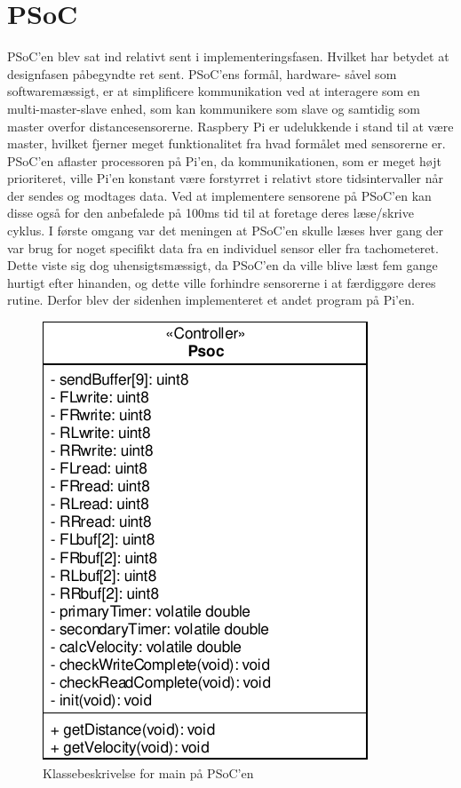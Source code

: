 \section{PSoC} \label{sec:sw_design_psoc_psoc}

PSoC'en blev sat ind relativt sent i implementeringsfasen. Hvilket har betydet at designfasen påbegyndte ret sent.
PSoC'ens formål, hardware- såvel som softwaremæssigt, er at simplificere \IIC kommunikation ved at interagere som en multi-master-slave enhed, som kan kommunikere som \IIC slave og samtidig som \IIC master overfor distancesensorerne. 
Raspbery Pi er udelukkende i stand til at være master, hvilket fjerner meget funktionalitet fra hvad formålet med sensorerne er. 
PSoC'en aflaster processoren på Pi'en, da \IIC kommunikationen, som er meget højt prioriteret, ville Pi'en konstant være forstyrret i relativt store tidsintervaller når der sendes og modtages data. 
Ved at implementere sensorene på PSoC'en kan disse også for den anbefalede på 100ms tid til at foretage deres læse/skrive cyklus. 
I første omgang var det meningen at PSoC'en skulle læses hver gang der var brug for noget specifikt data fra en individuel sensor eller fra tachometeret. 
Dette viste sig dog uhensigtsmæssigt, da PSoC'en da ville blive læst fem gange hurtigt efter hinanden, og dette ville forhindre sensorerne i at færdiggøre deres rutine. Derfor blev der sidenhen implementeret et andet program på Pi'en. 

\begin{figure}[h]
\centering
\includegraphics[]{../fig/diagrammer/psoc/cd_psoc.pdf}
\caption{Klassebeskrivelse for main på PSoC'en}
\label{fig:cd_main_psoc}
\end{figure}

